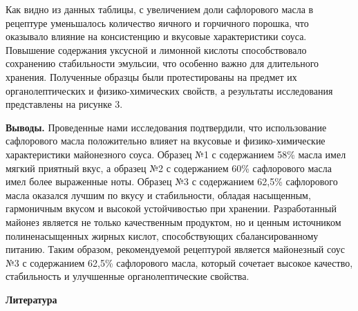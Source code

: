 \begin{multicols}{2}
Как видно из данных таблицы, с увеличением доли сафлорового масла в
рецептуре уменьшалось количество яичного и горчичного порошка, что
оказывало влияние на консистенцию и вкусовые характеристики соуса.
Повышение содержания уксусной и лимонной кислоты способствовало
сохранению стабильности эмульсии, что особенно важно для длительного
хранения. Полученные образцы были протестированы на предмет их
органолептических и физико-химических свойств, а результаты исследования
представлены на рисунке 3.

{\bfseries Выводы.} Проведенные нами исследования подтвердили, что
использование сафлорового масла положительно влияет на вкусовые и
физико-химические характеристики майонезного соуса. Образец №1 с
содержанием 58\% масла имел мягкий приятный вкус, а образец №2 с
содержанием 60\% сафлорового масла имел более выраженные ноты. Образец
№3 с содержанием 62,5\% сафлорового масла оказался лучшим по вкусу и
стабильности, обладая насыщенным, гармоничным вкусом и высокой
устойчивостью при хранении. Разработанный майонез является не только
качественным продуктом, но и ценным источником полиненасыщенных жирных
кислот, способствующих сбалансированному питанию. Таким образом,
рекомендуемой рецептурой является майонезный соус №3 с содержанием
62,5\% сафлорового масла, который сочетает высокое качество,
стабильность и улучшенные органолептические свойства.
\end{multicols}

\begin{center}
{\bfseries Литература}
\end{center}

